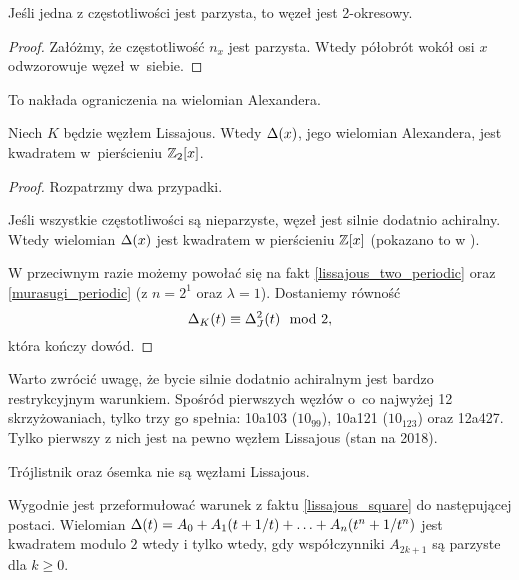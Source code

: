 \begin{proposition}
    \label{lissajous_two_periodic}
    Jeśli jedna z częstotliwości jest parzysta, to węzeł jest 2-okresowy.
\end{proposition}

\begin{proof}
    Załóżmy, że częstotliwość $n_x$ jest parzysta.
    Wtedy półobrót wokół osi $x$ odwzorowuje węzeł w~siebie.
\end{proof}

To nakłada ograniczenia na wielomian Alexandera.

\begin{proposition}
    \label{lissajous_square}
    Niech $K$ będzie węzłem Lissajous.
    Wtedy $\Delta(x)$, jego wielomian Alexandera, jest kwadratem w~pierścieniu $\mathbb Z_2[x]$.
\end{proposition}

\begin{proof}
    Rozpatrzmy dwa przypadki.

    Jeśli wszystkie częstotliwości są nieparzyste, węzeł jest silnie dodatnio achiralny.
    Wtedy wielomian $\Delta(x)$ jest kwadratem w pierścieniu $\mathbb Z[x]$ (pokazano to w \cite{hartley79}).

    W przeciwnym razie możemy powołać się na fakt \ref{lissajous_two_periodic} oraz \ref{murasugi_periodic} (z $n=2^1$ oraz $\lambda = 1$).
    Dostaniemy równość
    \begin{equation}
    	\label{lissajous_square_equiv}
        \Delta_K(t) \equiv \Delta^2_{J}(t) \mod 2,
    \end{equation}
    która kończy dowód.
\end{proof}

Warto zwrócić uwagę, że bycie silnie dodatnio achiralnym jest bardzo restrykcyjnym warunkiem.
Spośród pierwszych węzłów o~co najwyżej 12 skrzyżowaniach, tylko trzy go spełnia: 10a103 ($10_{99}$), 10a121 ($10_{123}$) oraz 12a427.
Tylko pierwszy z nich jest na pewno węzłem Lissajous (stan na 2018).

\begin{example}
    Trójlistnik oraz ósemka nie są węzłami Lissajous.
\end{example}

Wygodnie jest przeformułować warunek z faktu \ref{lissajous_square} do następującej postaci.
Wielomian $\Delta(t) = A_0 + A_1(t+1/t) + \ldots + A_n(t^n + 1/t^n)$ jest kwadratem modulo $2$ wtedy i tylko wtedy, gdy współczynniki $A_{2k+1}$ są parzyste dla $k \ge 0$.

